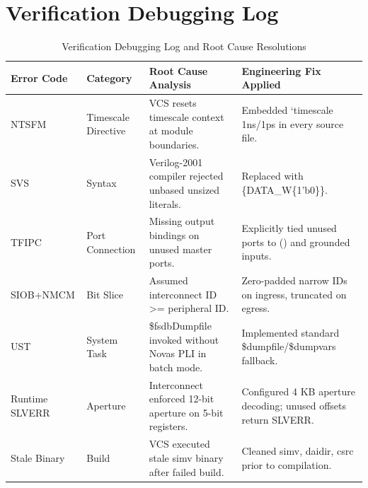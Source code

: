 \documentclass[12pt,a4paper,oneside]{report}
\begin{document}
\section{Verification Debugging Log}
\begin{table}[htbp]
\centering
\caption{Verification Debugging Log and Root Cause Resolutions}
\small
\begin{tabularx}{\textwidth}{llXX}
\toprule
\textbf{Error Code} & \textbf{Category} & \textbf{Root Cause Analysis} & \textbf{Engineering Fix Applied} \\
\midrule
NTSFM & Timescale Directive & VCS resets timescale context at module boundaries. & Embedded `timescale 1ns/1ps in every source file. \\
SVS & Syntax & Verilog-2001 compiler rejected unbased unsized literals. & Replaced with \{DATA\_W\{1'b0\}\}. \\
TFIPC & Port Connection & Missing output bindings on unused master ports. & Explicitly tied unused ports to () and grounded inputs. \\
SIOB+NMCM & Bit Slice & Assumed interconnect ID >= peripheral ID. & Zero-padded narrow IDs on ingress, truncated on egress. \\
UST & System Task & \$fsdbDumpfile invoked without Novas PLI in batch mode. & Implemented standard \$dumpfile/\$dumpvars fallback. \\
Runtime SLVERR & Aperture & Interconnect enforced 12-bit aperture on 5-bit registers. & Configured 4 KB aperture decoding; unused offsets return SLVERR. \\
Stale Binary & Build & VCS executed stale simv binary after failed build. & Cleaned simv, daidir, csrc prior to compilation. \\
\bottomrule
\end{tabularx}
\end{table}
\end{document}
